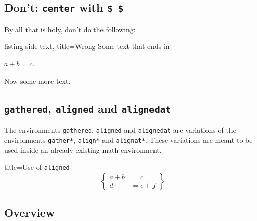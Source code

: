 \documentclass[a4paper, 10pt, headings=standardclasses, oneside, bibliography=totocnumbered]{scrbook}
\begin{document}
\subsection{Don’t: \texttt{center} with \texttt{\$ \$}}

By all that is holy, don’t do the following:
\begin{tcblisting}{listing side text, title={Wrong}}
Some text that ends in
\begin{center}
  $a + b = c$.
\end{center}
Now some more text.
\end{tcblisting}



\subsection{\texttt{gathered}, \texttt{aligned} and \texttt{alignedat}}

The environments \texttt{gathered}, \texttt{aligned} and \texttt{alignedat} are variations of the environments \texttt{gather*}, \texttt{align*} and \texttt{alignat*}.
These variations are meant to be used inside an already existing math environment.
\begin{tcblisting}{title={Use of \texttt{aligned}}}
\[
  \left\{
    \begin{aligned}
      a + b &= c      \\
      d     &= e + f
    \end{aligned}
  \right\}
\]
\end{tcblisting}




\subsection{Overview}
\end{document}
